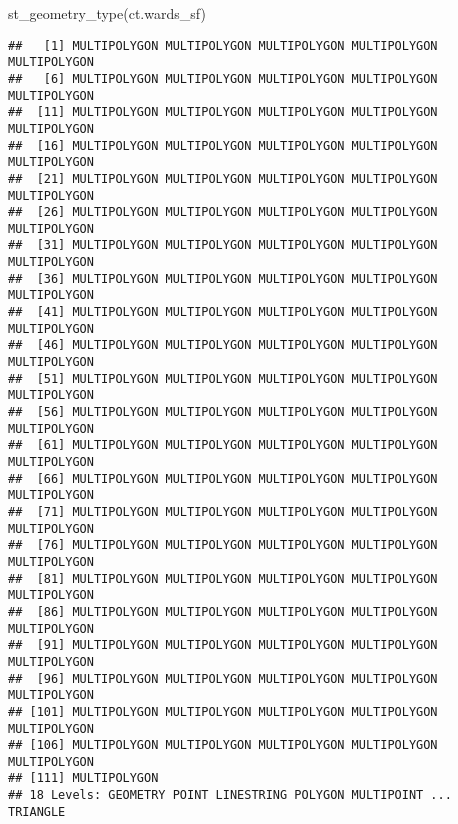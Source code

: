 \documentclass[
]{book}
\newenvironment{Shaded}{\begin{snugshade}}{\end{snugshade}}
\newcommand{\FunctionTok}[1]{\textcolor[rgb]{0.00,0.00,0.00}{#1}}
\newcommand{\NormalTok}[1]{#1}
\begin{document}
\begin{Shaded}
\begin{Highlighting}[]
\FunctionTok{st\_geometry\_type}\NormalTok{(ct.wards\_sf)}
\end{Highlighting}
\end{Shaded}

\begin{verbatim}
##   [1] MULTIPOLYGON MULTIPOLYGON MULTIPOLYGON MULTIPOLYGON MULTIPOLYGON
##   [6] MULTIPOLYGON MULTIPOLYGON MULTIPOLYGON MULTIPOLYGON MULTIPOLYGON
##  [11] MULTIPOLYGON MULTIPOLYGON MULTIPOLYGON MULTIPOLYGON MULTIPOLYGON
##  [16] MULTIPOLYGON MULTIPOLYGON MULTIPOLYGON MULTIPOLYGON MULTIPOLYGON
##  [21] MULTIPOLYGON MULTIPOLYGON MULTIPOLYGON MULTIPOLYGON MULTIPOLYGON
##  [26] MULTIPOLYGON MULTIPOLYGON MULTIPOLYGON MULTIPOLYGON MULTIPOLYGON
##  [31] MULTIPOLYGON MULTIPOLYGON MULTIPOLYGON MULTIPOLYGON MULTIPOLYGON
##  [36] MULTIPOLYGON MULTIPOLYGON MULTIPOLYGON MULTIPOLYGON MULTIPOLYGON
##  [41] MULTIPOLYGON MULTIPOLYGON MULTIPOLYGON MULTIPOLYGON MULTIPOLYGON
##  [46] MULTIPOLYGON MULTIPOLYGON MULTIPOLYGON MULTIPOLYGON MULTIPOLYGON
##  [51] MULTIPOLYGON MULTIPOLYGON MULTIPOLYGON MULTIPOLYGON MULTIPOLYGON
##  [56] MULTIPOLYGON MULTIPOLYGON MULTIPOLYGON MULTIPOLYGON MULTIPOLYGON
##  [61] MULTIPOLYGON MULTIPOLYGON MULTIPOLYGON MULTIPOLYGON MULTIPOLYGON
##  [66] MULTIPOLYGON MULTIPOLYGON MULTIPOLYGON MULTIPOLYGON MULTIPOLYGON
##  [71] MULTIPOLYGON MULTIPOLYGON MULTIPOLYGON MULTIPOLYGON MULTIPOLYGON
##  [76] MULTIPOLYGON MULTIPOLYGON MULTIPOLYGON MULTIPOLYGON MULTIPOLYGON
##  [81] MULTIPOLYGON MULTIPOLYGON MULTIPOLYGON MULTIPOLYGON MULTIPOLYGON
##  [86] MULTIPOLYGON MULTIPOLYGON MULTIPOLYGON MULTIPOLYGON MULTIPOLYGON
##  [91] MULTIPOLYGON MULTIPOLYGON MULTIPOLYGON MULTIPOLYGON MULTIPOLYGON
##  [96] MULTIPOLYGON MULTIPOLYGON MULTIPOLYGON MULTIPOLYGON MULTIPOLYGON
## [101] MULTIPOLYGON MULTIPOLYGON MULTIPOLYGON MULTIPOLYGON MULTIPOLYGON
## [106] MULTIPOLYGON MULTIPOLYGON MULTIPOLYGON MULTIPOLYGON MULTIPOLYGON
## [111] MULTIPOLYGON
## 18 Levels: GEOMETRY POINT LINESTRING POLYGON MULTIPOINT ... TRIANGLE
\end{verbatim}
\end{document}
